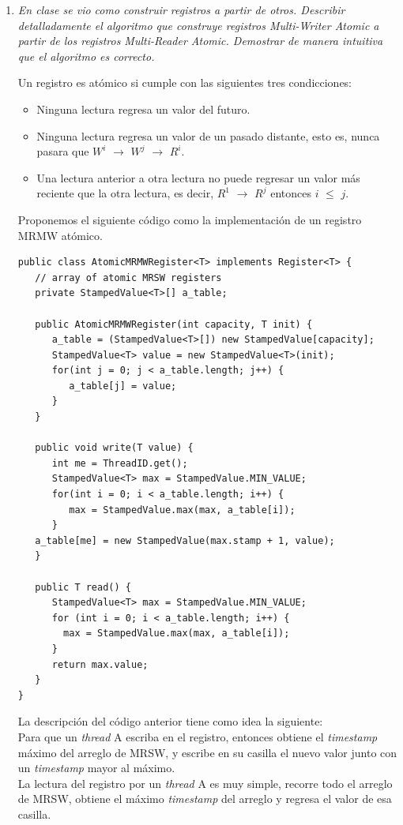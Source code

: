\documentclass{article}
\begin{document}
\begin{enumerate}
\item{\textsl {
      En clase se vio como construir registros a partir de
      otros. Describir detalladamente el algoritmo que construye
      registros Multi-Writer Atomic a partir de los registros
      Multi-Reader Atomic. Demostrar de manera intuitiva que el
      algoritmo es correcto.\\
    }
    
    Un registro es atómico si cumple con las siguientes tres
    condicciones:

    \begin{itemize}
      
    \item{Ninguna lectura regresa un valor del futuro.}
    \item{Ninguna lectura regresa un valor de un pasado distante, esto
        es, nunca pasara que $W^i$ $\rightarrow$ $W^j$ $\rightarrow$ $
        R^i$.}
      \item{Una lectura anterior a otra lectura no puede regresar un
          valor más reciente que la otra lectura, es decir, $R^1$
          $\rightarrow$ $R^j$ entonces $i$ $\leq$ $j$.}
    \end{itemize}
  
    Proponemos el siguiente código como la implementación de un
    registro MRMW atómico.
    
    \renewcommand{\lstlistingname}{}
\begin{lstlisting}[frame=single]
public class AtomicMRMWRegister<T> implements Register<T> {
   // array of atomic MRSW registers
   private StampedValue<T>[] a_table;

   public AtomicMRMWRegister(int capacity, T init) {
      a_table = (StampedValue<T>[]) new StampedValue[capacity];
      StampedValue<T> value = new StampedValue<T>(init);
      for(int j = 0; j < a_table.length; j++) {
         a_table[j] = value;
      }
   }

   public void write(T value) {
      int me = ThreadID.get();
      StampedValue<T> max = StampedValue.MIN_VALUE;
      for(int i = 0; i < a_table.length; i++) {
         max = StampedValue.max(max, a_table[i]);
      }
   a_table[me] = new StampedValue(max.stamp + 1, value);
   }

   public T read() {
      StampedValue<T> max = StampedValue.MIN_VALUE;
      for (int i = 0; i < a_table.length; i++) {
        max = StampedValue.max(max, a_table[i]);
      }
      return max.value;
   }
}
\end{lstlisting}
    La descripción del código anterior tiene como idea la siguiente:\\
    Para que un \textit{thread} A escriba en el registro, entonces
    obtiene el \textit{timestamp} máximo del arreglo de MRSW, y
    escribe en su casilla el nuevo valor junto con un
    \textit{timestamp} mayor al máximo.\\
    La lectura del registro por un \textit{thread} A es muy simple,
    recorre todo el arreglo de MRSW, obtiene el máximo
    \textit{timestamp} del arreglo y regresa el valor de esa
    casilla.\\

}
\end{enumerate}
\end{document}
